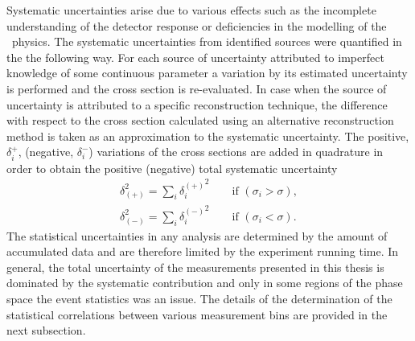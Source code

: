 Systematic uncertainties arise due to various effects such as the incomplete understanding of the detector response or deficiencies in the modelling of the \ep~physics. The systematic uncertainties from identified sources were quantified in the the following way. For each source of uncertainty attributed to imperfect knowledge of some continuous parameter a variation by its estimated uncertainty is performed and the cross section is re-evaluated. In case when the source of uncertainty is attributed to a specific reconstruction technique, the difference with respect to the cross section calculated using an alternative reconstruction method is taken as an approximation to the systematic uncertainty. The positive, $\delta^+_i$, (negative, $\delta^-_i$) variations of the cross sections are added in quadrature in order to obtain the positive (negative) total systematic uncertainty
\[
	\begin{aligned}
		\delta_{\left( +\right)}^{2} = \sum_i{\mbox{$\delta_i^{\left( +\right)}$}^2}\qquad \text{if $\left(\sigma_i > \sigma\right)$},\\
		\delta_{\left( -\right)}^{2} = \sum_i{\mbox{$\delta_i^{\left( -\right)}$}^2}\qquad \text{if $\left(\sigma_i < \sigma\right)$}.
	\end{aligned}
\]
The statistical uncertainties in any analysis are determined by the amount of accumulated data and are therefore limited by the experiment running time. In general, the total uncertainty of the measurements presented in this thesis is dominated by the systematic contribution and only in some regions of the phase space the event statistics was an issue. The details of the determination of the statistical correlations between various measurement bins are provided in the next subsection.

